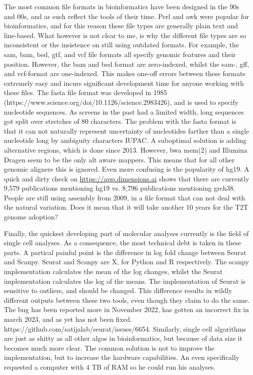 The most common file formats in bioinformatics have been designed in the 90s and 00s, and as such reflect the tools of their time. Perl and awk were popular for bioinformatics, and for this reason these file types are generally plain text and line-based. What however is not clear to me, is why the different file types are so inconsistent or the insistence on still using outdated formats. For example, the sam, bam, bed, gtf, and vcf file formats all specify genomic features and their position. However, the bam and bed format are zero-indexed\cite{Li2009}, whilst the sam-, gff, and vcf-format are one-indexed\cite{Li2009,Danecek2011}. This makes one-off errors between these formats extremely easy and incurs significant development time for anyone working with these files. The fasta file format was developed in 1985 (https://www.science.org/doi/10.1126/science.2983426), and is used to specify nucleotide sequences. As screens in the past had a limited width, long sequences got split over stretches of 80 characters. The problem with the fasta format is that it can not naturally represent uncertainty of nucleotides farther than a single nucleotide long by ambiguity characters IUPAC. A suboptimal solution is adding alternative regions, which is done since 2013. However, bwa mem(2) and Illumina Dragen seem to be the only alt aware mappers. This means that for all other genomic aligners this is ignored. Even more confusing is the popularity of hg19. A quick and dirty check on \url{https://app.dimensions.ai} shows that there are currently 9,579 publications mentioning hg19 vs. 8,796 publications mentioning grch38. People are still using assembly from 2009, in a file format that can not deal with the natural variation. Does it mean that it will take another 10 years for the T2T genome adoption? 

Finally, the quickest developing part of molecular analyses currently is the field of single cell analyses. As a consequence, the most technical debt is taken in these parts. A partical painful point is the difference in log fold change between Seurat and Scanpy. Seurat and Scanpy are X, for Python and R respectively. The scanpy implementation calculates the mean of the log changes, whilst the Seurat implementation calculates the log of the means. The implementation of Seurat is sensitive to outliers, and should be changed. This difference results in wildly different outputs between these two tools, even though they claim to do the same. The bug has been reported more in November 2022, has gotten an incorrect fix in march 2023, and as yet has not been fixed. https://github.com/satijalab/seurat/issues/6654. Similarly, single cell algorithms are just  as shitty as all other algos in bioinformatics, but because of data size it becomes much more clear. The common solution is not to improve the implementation, but to increase the hardware capabilities. An even specifically requested a computer with 4 TB of RAM so he could run his analyses. 

